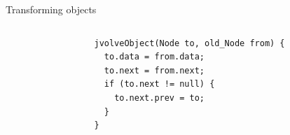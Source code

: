 \begin{frame}[fragile]{Transforming objects}%
\begin{columns}[c]
\begin{column}{0.7\paperwidth}
%
%
\end{column}
\begin{column}{0.3\paperwidth}
\begin{tiny}
\begin{verbatim}
jvolveObject(Node to, old_Node from) {
  to.data = from.data;
  to.next = from.next;
  if (to.next != null) {
    to.next.prev = to;
  }
}
\end{verbatim}
\end{tiny}
\end{column}
\end{columns}
\end{frame}

